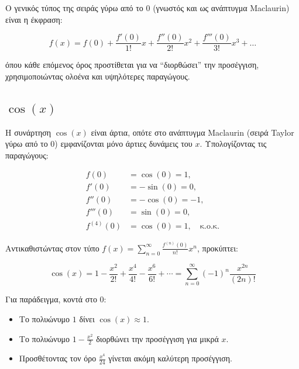 \documentclass[a4paper, 11pt]{article}
\begin{document}
Ο γενικός τύπος της σειράς γύρω από το \(0\) (γνωστός και ως ανάπτυγμα
Maclaurin) είναι η έκφραση:

\[f(x) = f(0) + \frac{f'(0)}{1!}x + \frac{f''(0)}{2!}x^2 + \frac{f'''(0)}{3!}x^3 + \dots\]

όπου κάθε επόμενος όρος προστίθεται για να ``διορθώσει'' την προσέγγιση,
χρησιμοποιώντας ολοένα και υψηλότερες παραγώγους.

\subsection{\texorpdfstring{\(\cos(x)\)}{\textbackslash cos(x)}}\label{cosx}

Η συνάρτηση \(\cos(x)\) είναι άρτια, οπότε στο ανάπτυγμα Maclaurin
(σειρά Taylor γύρω από το \(0\)) εμφανίζονται μόνο άρτιες δυνάμεις του
\(x\). Υπολογίζοντας τις παραγώγους:

\[
\begin{aligned}
f(0) &= \cos(0) = 1, \\
f'(0) &= -\sin(0) = 0, \\
f''(0) &= -\cos(0) = -1, \\
f'''(0) &= \sin(0) = 0, \\
f^{(4)}(0) &= \cos(0) = 1, \quad \text{κ.ο.κ.}
\end{aligned}
\]

Αντικαθιστώντας στον τύπο
\(f(x)=\sum_{n=0}^{\infty} \frac{f^{(n)}(0)}{n!}x^n\), προκύπτει:

\[
\cos(x) = 1 - \frac{x^2}{2!} + \frac{x^4}{4!} - \frac{x^6}{6!} + \cdots = \sum_{n=0}^{\infty} (-1)^n \frac{x^{2n}}{(2n)!}
\]

Για παράδειγμα, κοντά στο \(0\):

\begin{itemize}
\item
  Το πολυώνυμο \(1\) δίνει \(\cos(x)\approx 1\).
\item
  Το πολυώνυμο \(1 - \frac{x^2}{2}\) διορθώνει την προσέγγιση για μικρά
  \(x\).
\item
  Προσθέτοντας τον όρο \(\frac{x^4}{24}\) γίνεται ακόμη καλύτερη
  προσέγγιση.
\end{itemize}
\end{document}

